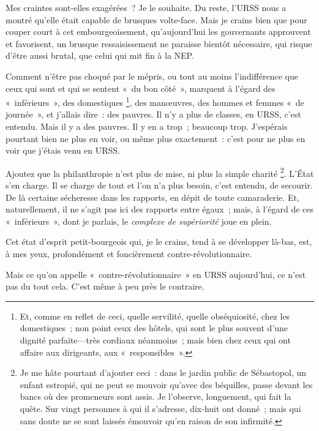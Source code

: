 \documentclass[french,twoside]{book} %
\begin{document}
Mes craintes sont-elles exagérées ? Je le souhaite. Du reste, l’URSS nous a montré qu’elle était capable de brusques volte-face. Mais je crains bien que pour couper court à cet embourgeoisement, qu’aujourd’hui les gouvernants approuvent et favorisent, un brusque ressaisissement ne paraisse bientôt nécessaire, qui risque d’être aussi brutal, que celui qui mit fin à la NEP.\par
Comment n’être pas choqué par le mépris, ou tout au moins l’indifférence que ceux qui sont et qui se sentent « du bon côté », marquent à l’égard des « inférieurs », des domestiques \footnote{Et, comme en reflet de ceci, quelle servilité, quelle obséquiosité, chez les domestiques ; non point ceux des hôtels, qui sont le plus souvent d’une dignité parfaite—très cordiaux néanmoins ; mais bien chez ceux qui ont affaire aux dirigeants, aux « responsibles ».}, des manœuvres, des hommes et femmes « de journée », et j’allais dire : des pauvres. Il n’y a plus de classes, en URSS, c’est entendu. Mais il y a des pauvres. Il y en a trop ; beaucoup trop. J’espérais pourtant bien ne plus en voir, ou même plus exactement : c’est pour ne plus en voir que j’étais venu en URSS.\par
Ajoutez que la philanthropie n’est plus de mise, ni plus la simple charité \footnote{Je me hâte pourtant d’ajouter ceci : dans le jardin public de Sébastopol, un enfant estropié, qui ne peut se mouvoir qu’avec des béquilles, passe devant les bancs où des promeneurs sont assis. Je l’observe, longuement, qui fait la quête. Sur vingt personnes à qui il s’adresse, dix-huit ont donné ; mais qui sans doute ne se sont laissés émouvoir qu’en raison de son infirmité.}. L’État s’en charge. Il se charge de tout et l’on n’a plus besoin, c’est entendu, de secourir. De là certaine sécheresse dans les rapports, en dépit de toute camaraderie. Et, naturellement, il ne s’agit pas ici des rapports entre égaux ; mais, à l’égard de ces « inférieurs », dont je parlais, le \emph{complexe de supériorité} joue en plein.\par
Cet état d’esprit petit-bourgeois qui, je le crains, tend à se développer là-bas, est, à mes yeux, profondément et foncièrement contre-révolutionnaire.\par
Mais ce qu’on appelle « contre-révolutionnaire » en URSS aujourd’hui, ce n’est pas du tout cela. C’est même à peu près le contraire.\par
\end{document}
